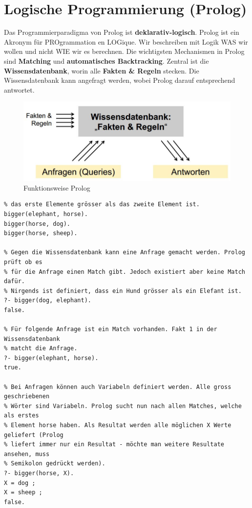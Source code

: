 \chapter{Logische Programmierung (Prolog)}
Das Programmierparadigma von Prolog ist \textbf{deklarativ-logisch}. Prolog ist ein Akronym für PROgrammation en LOGique. Wir beschreiben mit Logik WAS wir wollen und nicht WIE wir es berechnen. Die wichtigsten Mechanismen in Prolog sind \textbf{Matching} und \textbf{automatisches Backtracking}. Zentral ist die \textbf{Wissensdatenbank}, worin alle \textbf{Fakten \& Regeln} stecken. Die Wissensdatenbank kann angefragt werden, wobei Prolog darauf entsprechend antwortet.

\begin{figure}[h!]
\centering
\includegraphics[width=0.7\linewidth]{fig/prolog-funktionsweise}
\caption{Funktionsweise Prolog}
\label{fig:funktionsweise-prolog}
\end{figure}

\begin{lstlisting}[caption=Wissensdatebank mit nur Fakten]
% In folgender Wissensdatenbank sind drei Fakten enthalten. Bigger definiert, dass
% das erste Elemente grösser als das zweite Element ist.
bigger(elephant, horse).
bigger(horse, dog).
bigger(horse, sheep).

% Gegen die Wissensdatenbank kann eine Anfrage gemacht werden. Prolog prüft ob es 
% für die Anfrage einen Match gibt. Jedoch existiert aber keine Match dafür. 
% Nirgends ist definiert, dass ein Hund grösser als ein Elefant ist.
?- bigger(dog, elephant).
false.

% Für folgende Anfrage ist ein Match vorhanden. Fakt 1 in der Wissensdatenbank 
% matcht die Anfrage.
?- bigger(elephant, horse).
true.

% Bei Anfragen können auch Variabeln definiert werden. Alle gross geschriebenen 
% Wörter sind Variabeln. Prolog sucht nun nach allen Matches, welche als erstes 
% Element horse haben. Als Resultat werden alle möglichen X Werte geliefert (Prolog 
% liefert immer nur ein Resultat - möchte man weitere Resultate ansehen, muss 
% Semikolon gedrückt werden).
?- bigger(horse, X).
X = dog ;
X = sheep ;
false.
\end{lstlisting}

